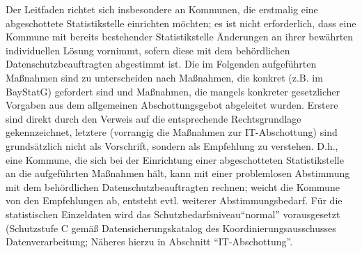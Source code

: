 Der Leitfaden richtet sich insbesondere an Kommunen, die erstmalig eine abgeschottete Statistikstelle einrichten möchten; es ist nicht erforderlich, dass eine Kommune mit bereits bestehender Statistikstelle Änderungen an ihrer bewährten individuellen Lösung vornimmt, sofern diese mit dem behördlichen Datenschutzbeauftragten abgestimmt ist.
Die im Folgenden aufgeführten Maßnahmen sind zu unterscheiden nach Maßnahmen, die konkret (z.B. im BayStatG) gefordert sind und Maßnahmen, die mangels konkreter gesetzlicher Vorgaben aus dem allgemeinen Abschottungsgebot abgeleitet wurden. Erstere sind direkt durch den Verweis auf die entsprechende Rechtsgrundlage gekennzeichnet, letztere (vorrangig die Maßnahmen zur IT-Abschottung) sind grundsätzlich nicht als Vorschrift, sondern als Empfehlung zu verstehen. D.h., eine Kommune, die sich bei der Einrichtung einer abgeschotteten Statistikstelle an die aufgeführten Maßnahmen hält, kann mit einer problemlosen Abstimmung mit dem behördlichen Datenschutzbeauftragten rechnen; weicht die Kommune von den Empfehlungen ab, entsteht evtl. weiterer Abstimmungsbedarf. Für die statistischen Einzeldaten wird das Schutzbedarfsniveau``normal'' vorausgesetzt (Schutzstufe C gemäß Datensicherungskatalog des Koordinierungsausschusses Datenverarbeitung; Näheres hierzu in Abschnitt ``IT-Abschottung''.

